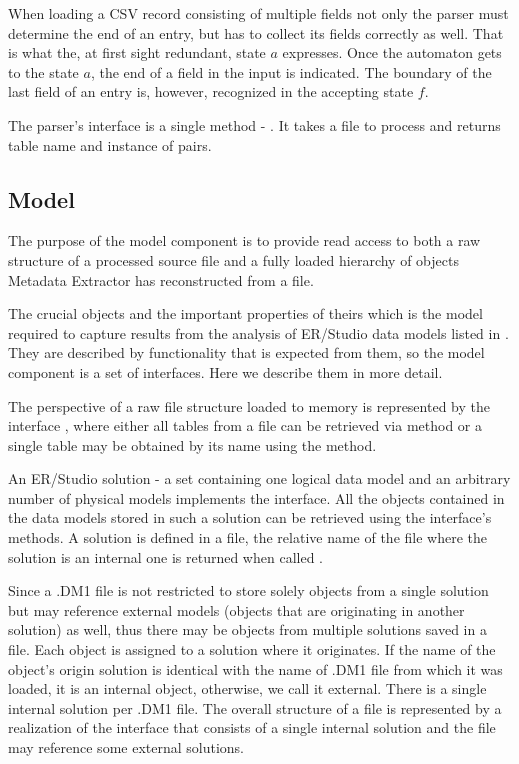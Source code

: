 When loading a CSV record consisting of multiple fields not only the parser must determine the end of an entry, but has to collect its fields correctly as well. That is what the, at first sight redundant, state $a$ expresses. Once the automaton gets to the state $a$, the end of a field in the input is indicated. 
The boundary of the last field of an entry is, however, recognized in the accepting state $f$.

The parser's interface is a single method - . It takes a file to process and returns table name and instance of  pairs.

\subsection{Model}

The purpose of the model component is to provide read access to both a raw structure of a processed source file and a fully loaded hierarchy of objects Metadata Extractor has reconstructed from a file.

The crucial objects and the important properties of theirs which is the model required to capture results from the analysis of ER/Studio data models listed in . They are described by functionality that is expected from them, so the model component is a set of interfaces. Here we describe them in more detail.

The perspective of a raw file structure loaded to memory is represented by the interface , where either all tables from a file can be retrieved via  method or a single table may be obtained by its name using the  method.

An ER/Studio solution - a set containing one logical data model and an arbitrary number of physical models implements the  interface. All the objects contained in the data models stored in such a solution can be retrieved using the interface's methods. A solution is defined in a file, the relative name of the file where the solution is an internal one is returned when called .

Since a .DM1 file is not restricted to store solely objects from a single solution but may reference external models (objects that are originating in another solution) as well, thus there may be objects from multiple solutions saved in a file. Each object is assigned to a solution where it originates.
If the name of the object's origin solution is identical with the name of .DM1 file from which it was loaded, it is an internal object, otherwise, we call it external. There is a single internal solution per .DM1 file. 
The overall structure of a file is represented by a realization of the  interface that consists of a single internal solution and the file may reference some external solutions.

